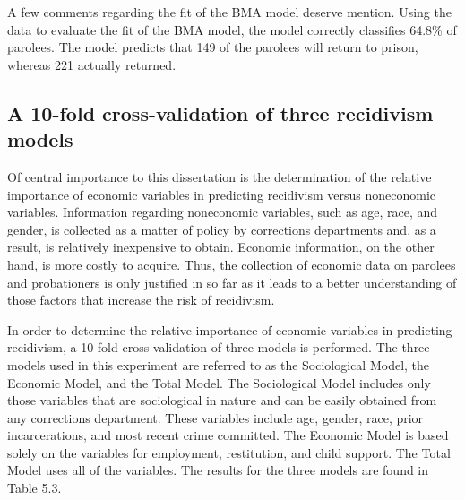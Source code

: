 A few comments regarding the fit of the BMA model deserve mention.  Using the data to evaluate the fit of the BMA model, the model correctly classifies 64.8\% of parolees.  The model predicts that 149 of the parolees will return to prison, whereas 221 actually returned.

\subsection{A 10-fold cross-validation of three recidivism models}

Of central importance to this dissertation is the determination of the relative importance of economic variables in predicting recidivism versus noneconomic variables.  Information regarding noneconomic variables, such as age, race, and gender, is collected as a matter of policy by corrections departments and, as a result, is relatively inexpensive to obtain.  Economic information, on the other hand, is more costly to acquire.  Thus, the collection of economic data on parolees and probationers is only justified in so far as it leads to a better understanding of those factors that increase the risk of recidivism.

In order to determine the relative importance of economic variables in predicting recidivism, a 10-fold cross-validation of three models is performed.  The three models used in this experiment are referred to as the Sociological Model, the Economic Model, and the Total Model.  The Sociological Model includes only those variables that are sociological in nature and can be easily obtained from any corrections department.  These variables include age, gender, race, prior incarcerations, and most recent crime committed.  The Economic Model is based solely on the variables for employment, restitution, and child support.  The Total Model uses all of the variables.  The results for the three models are found in Table 5.3.

